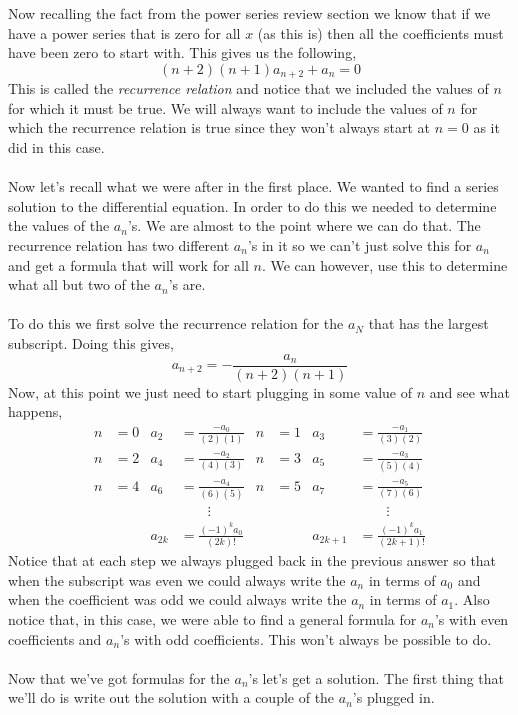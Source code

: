 \documentclass[10pt,reqno]{book}
\theoremstyle{definition}
\begin{document}
	Now recalling the fact from the power series review section we know that if we have a power series that is zero for all $ x $ (as this is) then all the coefficients must have been zero to start with. This gives us the following,
	\[ (n+2)(n+1)a_{n+2} + a_n = 0 \]
	This is called the \textit{recurrence relation} and notice that we included the values of $ n $ for which it must be true. We will always want to include the values of $ n $ for which the recurrence relation is true since they won't always start at $ n = 0 $ as it did in this case.\\ \\
	Now let's recall what we were after in the first place. We wanted to find a series solution to the differential equation. In order to do this we needed to determine the values of the $ a_n $'s. We are almost to the point where we can do that. The recurrence relation has two different $ a_n $'s in it so we can't just solve this for $ a_n $ and get a formula that will work for all $ n $. We can however, use this to determine what all but two of the $ a_n $'s are.\\ \\
	To do this we first solve the recurrence relation for the $ a_N $ that has the largest subscript. Doing this gives,
	\[ a_{n+2} = -\frac{a_n}{(n+2)(n+1)} \]
	Now, at this point we just need to start plugging in some value of $ n $ and see what happens,
	\begin{align*}
	n&=0	&  a_2&=\frac{-a_0}{(2)(1)}		&  n&=1		& a_3 &= \frac{-a_1}{(3)(2)}\\
	n&=2	&  a_4&=\frac{-a_2}{(4)(3)}		&  n&=3		& a_5 &= \frac{-a_3}{(5)(4)}\\
	n&=4	&  a_6&=\frac{-a_4}{(6)(5)}		&  n&=5		& a_7 &= \frac{-a_5}{(7)(6)}\\
	&		&	&\qquad \vdots 				&	&		& & \qquad \vdots\\
	&		&	a_{2k} &= \frac{(-1)^k a_0}{(2k)!} 		& & &a_{2k+1} &= \frac{(-1)^k a_1}{(2k+1)!}
	\end{align*}
	Notice that at each step we always plugged back in the previous answer so that when the subscript was even we could always write the $ a_n $ in terms of $ a_0 $ and when the coefficient was odd we could always write the $ a_n $ in terms of $ a_1 $. Also notice that, in this case, we were able to find a general formula for $ a_n $'s with even coefficients and $ a_n $'s with odd coefficients. This won't always be possible to do.\\ \\
	Now that we've got formulas for the $ a_n $'s let's get a solution. The first thing that we'll do is write out the solution with a couple of the $ a_n $'s plugged in.
\end{document}

